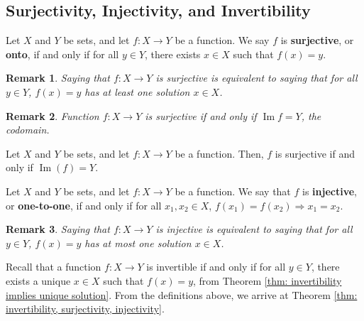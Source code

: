 \documentclass[]{book}
\DeclareMathOperator{\image}{Im}
\newtheorem*{remark}{Remark}
\begin{document}
\subsection{Surjectivity, Injectivity, and Invertibility}
\begin{definition}
    \label{defn: surjectivity, onto}
    Let $X$ and $Y$ be sets, and let $f:X \to Y$ be a function. We say $f$ is \textbf{surjective}, or \textbf{onto}, if and only if for all $y \in Y$, there exists $x \in X$ such that $f(x) = y$.
\end{definition}
\begin{remark}
    Saying that $f:X \to Y$ is surjective is equivalent to saying that for all $y \in Y$, $f(x)=y$ has at least one solution $x \in X$.
\end{remark}
\begin{remark}
    Function $f:X \to Y$ is surjective if and only if $\image f = Y$, the codomain.
\end{remark}
\begin{theorem}
    \label{thm: surjectivity and image}
    Let $X$ and $Y$ be sets, and let $f:X \to Y$ be a function. Then, $f$ is surjective if and only if $\image(f) = Y$.
\end{theorem}
\begin{definition}
    \label{defn: injectivity, one-to-one}
    Let $X$ and $Y$ be sets, and let $f: X \to Y$ be a function. We say that $f$ is \textbf{injective}, or \textbf{one-to-one}, if and only if for all $x_1, x_2 \in X$, $f(x_1) = f(x_2) \Longrightarrow x_1 = x_2$.
\end{definition}
\begin{remark}
    Saying that $f:X \to Y$ is injective is equivalent to saying that for all $y \in Y$, $f(x)=y$ has at most one solution $x \in X$.
\end{remark}

Recall that a function $f: X \to Y$ is invertible if and only if for all $y \in Y$, there exists a unique $x \in X$ such that $f(x)=y$, from Theorem \ref{thm: invertibility implies unique solution}. From the definitions above, we arrive at Theorem \ref{thm: invertibility, surjectivity, injectivity}.
\end{document}
